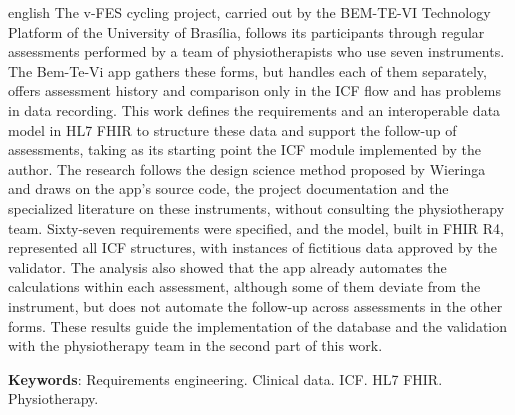 \begin{resumo}[Abstract]
 \begin{otherlanguage*}{english}
   The v-FES cycling project, carried out by the BEM-TE-VI Technology Platform of the University of Brasília,
   follows its participants through regular assessments performed by a team of physiotherapists who use seven
   instruments. The Bem-Te-Vi app gathers these forms, but handles each of them separately, offers assessment
   history and comparison only in the ICF flow and has problems in data recording. This work defines the
   requirements and an interoperable data model in HL7 FHIR to structure these data and support the follow-up of
   assessments, taking as its starting point the ICF module implemented by the author. The research follows the
   design science method proposed by Wieringa and draws on the app's source code, the project documentation and
   the specialized literature on these instruments, without consulting the physiotherapy team. Sixty-seven
   requirements were specified, and the model, built in FHIR R4, represented all ICF structures, with instances
   of fictitious data approved by the validator. The analysis also showed that the app already automates the
   calculations within each assessment, although some of them deviate from the instrument, but does not automate
   the follow-up across assessments in the other forms. These results guide the implementation of the database
   and the validation with the physiotherapy team in the second part of this work.

   \vspace{\onelineskip}

   \noindent
   \textbf{Keywords}: Requirements engineering. Clinical data. ICF. HL7 FHIR. Physiotherapy.
 \end{otherlanguage*}
\end{resumo}
